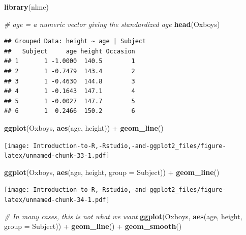 \documentclass[]{book}
\newenvironment{Shaded}{\begin{snugshade}}{\end{snugshade}}
\newcommand{\KeywordTok}[1]{\textcolor[rgb]{0.13,0.29,0.53}{\textbf{{#1}}}}
\newcommand{\DataTypeTok}[1]{\textcolor[rgb]{0.13,0.29,0.53}{{#1}}}
\newcommand{\StringTok}[1]{\textcolor[rgb]{0.31,0.60,0.02}{{#1}}}
\newcommand{\CommentTok}[1]{\textcolor[rgb]{0.56,0.35,0.01}{\textit{{#1}}}}
\newcommand{\NormalTok}[1]{{#1}}
\begin{document}
\begin{Shaded}
\begin{Highlighting}[]
\KeywordTok{library}\NormalTok{(nlme)}
\end{Highlighting}
\end{Shaded}

\begin{Shaded}
\begin{Highlighting}[]
\CommentTok{# age = a numeric vector giving the standardized age }
\KeywordTok{head}\NormalTok{(Oxboys)}
\end{Highlighting}
\end{Shaded}

\begin{verbatim}
## Grouped Data: height ~ age | Subject
##   Subject     age height Occasion
## 1       1 -1.0000  140.5        1
## 2       1 -0.7479  143.4        2
## 3       1 -0.4630  144.8        3
## 4       1 -0.1643  147.1        4
## 5       1 -0.0027  147.7        5
## 6       1  0.2466  150.2        6
\end{verbatim}

\begin{Shaded}
\begin{Highlighting}[]
\KeywordTok{ggplot}\NormalTok{(Oxboys, }\KeywordTok{aes}\NormalTok{(age, height)) +}\StringTok{ }\KeywordTok{geom_line}\NormalTok{()}
\end{Highlighting}
\end{Shaded}

\texttt{[image: Introduction-to-R,-Rstudio,-and-ggplot2\_files/figure-latex/unnamed-chunk-33-1.pdf]}

\begin{Shaded}
\begin{Highlighting}[]
\KeywordTok{ggplot}\NormalTok{(Oxboys, }\KeywordTok{aes}\NormalTok{(age, height, }\DataTypeTok{group =} \NormalTok{Subject)) +}\StringTok{ }\KeywordTok{geom_line}\NormalTok{()}
\end{Highlighting}
\end{Shaded}

\texttt{[image: Introduction-to-R,-Rstudio,-and-ggplot2\_files/figure-latex/unnamed-chunk-34-1.pdf]}

\begin{Shaded}
\begin{Highlighting}[]
\CommentTok{# In many cases, this is not what we want}
\KeywordTok{ggplot}\NormalTok{(Oxboys, }\KeywordTok{aes}\NormalTok{(age, height, }\DataTypeTok{group =} \NormalTok{Subject)) +}\StringTok{ }\KeywordTok{geom_line}\NormalTok{() +}\StringTok{ }\KeywordTok{geom_smooth}\NormalTok{()}
\end{Highlighting}
\end{Shaded}
\end{document}
